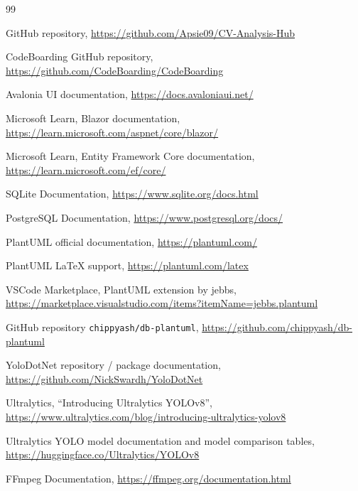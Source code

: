 {}

\small
\begin{thebibliography}{99}

\projectname{} GitHub repository, \url{https://github.com/Apsie09/CV-Analysis-Hub}

CodeBoarding GitHub repository, \url{https://github.com/CodeBoarding/CodeBoarding}

Avalonia UI documentation, \url{https://docs.avaloniaui.net/}

Microsoft Learn, Blazor documentation, \url{https://learn.microsoft.com/aspnet/core/blazor/}

Microsoft Learn, Entity Framework Core documentation, \url{https://learn.microsoft.com/ef/core/}

SQLite Documentation, \url{https://www.sqlite.org/docs.html}

PostgreSQL Documentation, \url{https://www.postgresql.org/docs/}

PlantUML official documentation, \url{https://plantuml.com/}

PlantUML LaTeX support, \url{https://plantuml.com/latex}

VSCode Marketplace, PlantUML extension by jebbs, \url{https://marketplace.visualstudio.com/items?itemName=jebbs.plantuml}

GitHub repository \texttt{chippyash/db-plantuml}, \url{https://github.com/chippyash/db-plantuml}

YoloDotNet repository / package documentation, \url{https://github.com/NickSwardh/YoloDotNet}

Ultralytics, \enquote{Introducing Ultralytics YOLOv8}, \url{https://www.ultralytics.com/blog/introducing-ultralytics-yolov8}

Ultralytics YOLO model documentation and model comparison tables, \url{https://huggingface.co/Ultralytics/YOLOv8}

FFmpeg Documentation, \url{https://ffmpeg.org/documentation.html}

\end{thebibliography}
